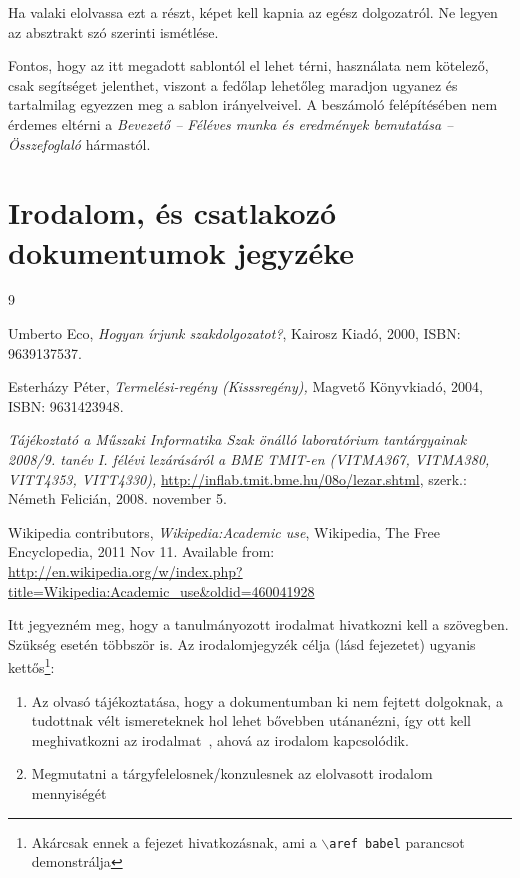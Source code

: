 \documentclass[a4paper,oneside]{article}
\begin{document}
Ha valaki elolvassa ezt a részt, képet kell kapnia az egész
dolgozatról.  Ne legyen az absztrakt szó szerinti ismétlése.

Fontos, hogy az itt megadott sablontól el lehet térni, használata nem
kötelező, csak segítséget jelenthet, viszont a fedőlap lehetőleg
maradjon ugyanez és tartalmilag egyezzen meg a sablon irányelveivel. A
beszámoló felépítésében nem érdemes eltérni a \emph{Bevezető --
  Féléves munka és eredmények bemutatása -- Összefoglaló} hármastól.

\newpage
 
\section{Irodalom, és csatlakozó dokumentumok jegyzéke}
\label{sec:irod-es-csatl}

\begin{thebibliography}{9}
\label{sec:tanulm-irod-jegyz}

 Umberto Eco, \emph{Hogyan írjunk szakdolgozatot?},
  Kairosz Kiadó, 2000, ISBN: 9639137537.

 Esterházy Péter, \emph{Termelési-regény (Kisssregény),}
  Magvető Könyvkiadó, 2004, ISBN: 9631423948.

 \emph{Tájékoztató a Műszaki Informatika Szak önálló
    laboratórium tantárgyainak 2008/9. tanév I. félévi lezárásáról a
    BME TMIT-en (VITMA367, VITMA380, VITT4353, VITT4330),}
  \url{http://inflab.tmit.bme.hu/08o/lezar.shtml}, szerk.: Németh Felicián,
  2008. november 5.

 Wikipedia contributors, \emph{Wikipedia:Academic
    use}, Wikipedia, The Free Encyclopedia, 2011 Nov 11.  Available
  from: \\ \url{http://en.wikipedia.org/w/index.php?title=Wikipedia:Academic\_use\&oldid=460041928}

\end{thebibliography}

Itt jegyezném meg, hogy a tanulmányozott irodalmat hivatkozni kell a
szövegben.  Szükség esetén többször is.  Az irodalomjegyzék célja
(lásd  fejezetet) ugyanis
kettős\footnote{Akárcsak ennek a fejezet hivatkozásnak, ami a
  \texttt{$\backslash$aref babel} parancsot demonstrálja}:
\begin{enumerate}
\item Az olvasó tájékoztatása, hogy a dokumentumban ki nem fejtett
  dolgoknak, a tudottnak vélt ismereteknek hol lehet bővebben
  utánanézni, így ott kell meghivatkozni az irodalmat~\cite{eco,
    esterhazy}, ahová az irodalom kapcsolódik.
\item Megmutatni a tárgyfelelosnek/konzulesnek az elolvasott irodalom
  mennyiségét
\end{enumerate}
\end{document}
